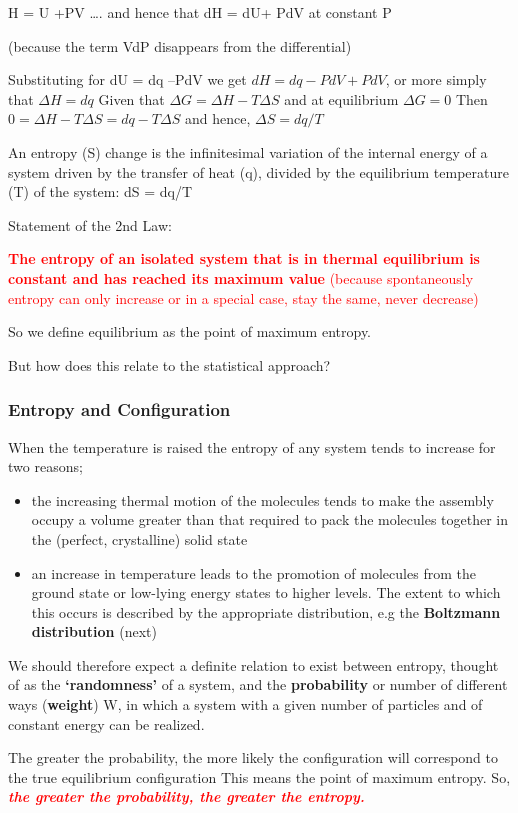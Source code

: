 \documentclass[ignorenonframetext]{beamer}
\begin{document}
\begin{frame}[allowframebreaks=0.65]
\begin{center}
 H = U +PV …. and hence that dH = dU+ PdV at constant P 
\end{center}
(because the term VdP disappears from the differential)

\medskip Substituting for dU = dq –PdV we get\newline
\medskip \(dH = dq - PdV+ PdV\), or more simply that \(\Delta H = dq\)\newline
\medskip Given that \(\Delta G = \Delta H - T\Delta S\) and at equilibrium \(\Delta G=0\) \newline
\medskip Then \(0 =  \Delta H - T\Delta S  =  dq- T\Delta S\) and hence, \(\Delta S = dq/T\)

\medskip An entropy (S) change is the infinitesimal variation of the internal energy of a system driven by the transfer of heat (q), divided by the equilibrium temperature (T) of the system: dS = dq/T

\bigskip Statement of the 2nd Law:

\textcolor{red}{\textbf{The entropy of an isolated system that is in thermal equilibrium is constant and has reached its maximum value} (because spontaneously entropy can only increase or in a special case, stay the same, never decrease)}
 
\medskip So we define equilibrium as the point of maximum entropy.

\medskip But how does this relate to the statistical approach?
\end{frame}

\begin{frame}[allowframebreaks]
\frametitle{Entropy and Configuration}
When the temperature is raised the entropy of any system tends to increase for two reasons;  
\begin{itemize}
\item the increasing thermal motion of the molecules tends to make the assembly occupy a volume greater than that required to pack the molecules together in the (perfect, crystalline)  solid state

\item an increase in temperature leads to the promotion of molecules from the ground state or low-lying energy states to higher levels.  The extent to which this occurs is described by the appropriate distribution, e.g the \textbf{Boltzmann distribution} (next)
 \end{itemize}
 
We should therefore expect a definite relation to exist between entropy, thought of as the \textbf{‘randomness’} of a system, and the \textbf{probability} or number of different ways (\textbf{weight})  W,  in which a system with a given number of particles and of constant energy can be realized.
 
\medskip The greater the probability, the more likely the configuration will correspond to the true equilibrium configuration
This means the point of maximum entropy. So, \textcolor{red}{\textbf{\textsl{the greater the probability, the greater the entropy.}}}
\end{frame}
\end{document}
